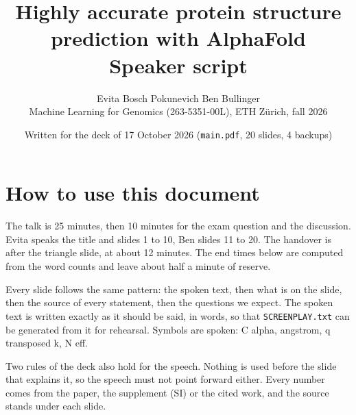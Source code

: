 \documentclass[10pt,a4paper]{article}
\title{\vspace{-10mm}\bfseries Highly accurate protein structure prediction with AlphaFold\\[1mm]\large\mdseries Speaker script}
\author{Evita Bosch Pokunevich \quad Ben Bullinger\\[1mm]\small Machine Learning for Genomics (263-5351-00L), ETH Z\"urich, fall 2026}
\date{\small Written for the deck of 17 October 2026 (\texttt{main.pdf}, 20 slides, 4 backups)}
\begin{document}
\maketitle

\section*{How to use this document}

The talk is 25 minutes, then 10 minutes for the exam question and the discussion. Evita speaks the title and slides 1 to 10, Ben slides 11 to 20. The handover is after the triangle slide, at about 12 minutes. The end times below are computed from the word counts and leave about half a minute of reserve.

Every slide follows the same pattern: the spoken text, then what is on the slide, then the source of every statement, then the questions we expect. The spoken text is written exactly as it should be said, in words, so that \texttt{SCREENPLAY.txt} can be generated from it for rehearsal. Symbols are spoken: C alpha, angstrom, q transposed k, N eff.

Two rules of the deck also hold for the speech. Nothing is used before the slide that explains it, so the speech must not point forward either. Every number comes from the paper, the supplement (SI) or the cited work, and the source stands under each slide.
\end{document}
